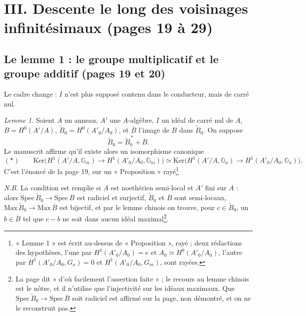 \documentclass[11pt,a4paper]{article}
\begin{document}
\section*{III. Descente le long des voisinages infinitésimaux (pages 19 à 29)}

\subsection*{Le lemme 1 : le groupe multiplicatif et le groupe additif (pages 19 et 20)}

Le cadre change : $I$ n'est plus supposé contenu dans le conducteur, mais de
carré nul.

\emph{Lemme 1.} Soient $A$ un anneau, $A'$ une $A$-algèbre, $I$ un idéal de
carré nul de $A$, $B = H^0(A'/A)$, $\widetilde{B}_0 = H^0(A'_0/A_0)$, et
$\overline{B}$ l'image de $B$ dans $\widetilde{B}_0$. On suppose
\[
  \widetilde{B}_0 = \widetilde{B}_0^{\,*} + \overline{B} .
\]
Le manuscrit affirme qu'il existe alors un isomorphisme canonique
\[
  (*) \qquad \mathrm{Ker}\bigl(H^1(A'/A, \mathbb{G}_m) \to H^1(A'_0/A_0,
  \mathbb{G}_m)\bigr) \simeq \mathrm{Ker}\bigl(H^1(A'/A, \mathbb{G}_a) \to
  H^1(A'_0/A_0, \mathbb{G}_a)\bigr) .
\]
C'est l'énoncé de la page 19, sur un « Proposition » rayé\footnote{« Lemme 1 » est écrit au-dessus de « Proposition », rayé ; deux
rédactions des hypothèses, l'une par $H^1(A'_0/A_0) = e$ et $A_0 \simeq
H^0(A'_0/A_0)$, l'autre par $H^1(A'_0/A_0, G_a) = 0$ et $H^1(A'_0/A_0,
G_m)$, sont rayées.}

\emph{N.B.} La condition est remplie si $A$ est noethérien semi-local et $A'$
fini sur $A$ : alors $\mathrm{Spec}\, \widetilde{B}_0 \to \mathrm{Spec}\,
\overline{B}$ est radiciel et surjectif, $\widetilde{B}_0$ et $\overline{B}$
sont semi-locaux, $\mathrm{Max}\, \widetilde{B}_0 \to \mathrm{Max}\,
\overline{B}$ est bijectif, et par le lemme chinois on trouve, pour $c \in
\widetilde{B}_0$, un $b \in \overline{B}$ tel que $c - b$ ne soit dans aucun
idéal maximal\footnote{La page dit « d'où facilement l'assertion faite » ; le
recours au lemme chinois est le nôtre, et il n'utilise que l'injectivité sur
les idéaux maximaux. Que $\mathrm{Spec}\, \widetilde{B}_0 \to
\mathrm{Spec}\, \overline{B}$ soit radiciel est affirmé sur la page, non
démontré, et on ne le reconstruit pas.}.
\end{document}
